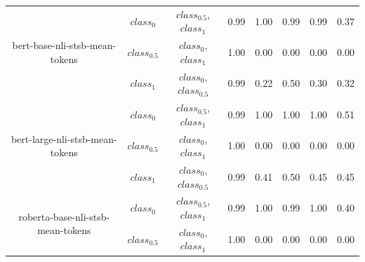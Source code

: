 \documentclass{ieeeaccess}
\begin{document}
\begin{table}[h!]
\begin{tabular}{|c|c|c|l|l|l|l|l|}
		\multirow{3}{*}{bert-base-nli-stsb-mean-tokens}       & $class_0$                     & $class_{0.5}$,$class_1$                   & 0.99                                   & 1.00                                    & 0.99                                 & 0.99                              & 0.37                              \\ \cline{2-8} 
		& $class_{0.5}$                     & $class_0$,$class_1$                   & 1.00                                   & 0.00                                    & 0.00                                 & 0.00                              & 0.00                              \\ \cline{2-8} 
		& $class_1$                       & $class_0$,$class_{0.5}$                 & 0.99                                   & 0.22                                    & 0.50                                 & 0.30                              & 0.32                              \\ \hline
		\multirow{3}{*}{bert-large-nli-stsb-mean-tokens}      & $class_0$                     & $class_{0.5}$,$class_1$                   & 0.99                                   & 1.00                                    & 1.00                                 & 1.00                              & 0.51                              \\ \cline{2-8} 
		& $class_{0.5}$                     & $class_0$,$class_1$                   & 1.00                                   & 0.00                                    & 0.00                                 & 0.00                              & 0.00                              \\ \cline{2-8} 
		& $class_1$                       & $class_0$,$class_{0.5}$                 & 0.99                                   & 0.41                                    & 0.50                                 & 0.45                              & 0.45                              \\ \hline
		\multirow{3}{*}{roberta-base-nli-stsb-mean-tokens}    & $class_0$                    & $class_{0.5}$,$class_1$                   & 0.99                                   & 1.00                                    & 0.99                                 & 1.00                              & 0.40                              \\ \cline{2-8} 
		& $class_{0.5}$                     & $class_0$,$class_1$                   & 1.00                                   & 0.00                                    & 0.00                                 & 0.00                              & 0.00                              \\ \cline{2-8} 

\end{tabular}
\end{table}
\end{document}
